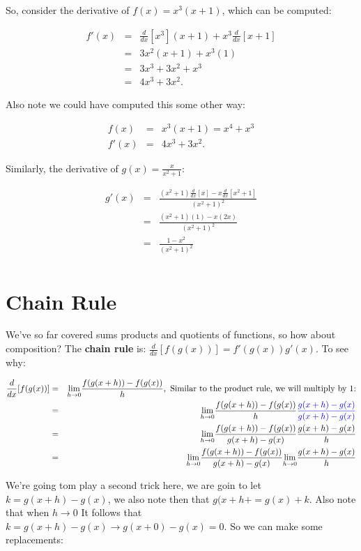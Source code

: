 So, consider the derivative of $f(x)=x^3(x+1)$, which can be computed:

\begin{eqnarray*}
f'(x)&=&\frac{d}{dx}[x^3](x+1)+x^3\frac{d}{dx}[x+1]\\
&=&3x^2(x+1)+x^3(1)\\
&=&3x^3+3x^2+x^3\\
&=&4x^3+3x^2.
\end{eqnarray*}

Also note we could have computed this some other way:

\begin{eqnarray*}
f(x)&=&x^3(x+1)=x^4+x^3\\
f'(x)&=&4x^3+3x^2.
\end{eqnarray*}

Similarly, the derivative of $g(x)=\frac{x}{x^2+1}$:

\begin{eqnarray*}
g'(x)&=&\frac{(x^2+1)\frac{d}{dx}[x]-x\frac{d}{dx}[x^2+1]}{(x^2+1)^2}\\
&=&\frac{(x^2+1)(1)-x(2x)}{(x^2+1)^2}\\
&=&\frac{1-x^2}{(x^2+1)^2}\\
\end{eqnarray*}


\section{Chain Rule}\label{Section:ChainRule}

We've so far covered sums products and quotients of functions, so how about composition?   The \textbf{ chain rule} is: $\frac{d}{dx}[f(g(x))]=f'(g(x))g'(x)$.  To see why:

\begin{eqnarray*}
\frac{d}{dx}[f(g(x))]&=&\limit{h}{0}\frac{f(g(x+h))-f(g(x))}{h},\ \text{Similar to the product rule, we will multiply by 1:}\\
&=&\limit{h}{0}\frac{f(g(x+h))-f(g(x))}{h}\textcolor{blue}{\frac{g(x+h)-g(x)}{g(x+h)-g(x)}}\\
&=&\limit{h}{0}\frac{f(g(x+h))-f(g(x))}{g(x+h)-g(x)}\frac{g(x+h)-g(x)}{h}\\
&=&\limit{h}{0}\frac{f(g(x+h))-f(g(x))}{g(x+h)-g(x)}\limit{h}{0}\frac{g(x+h)-g(x)}{h}\\
\end{eqnarray*}

We're going tom play a second trick here, we are goin to let $k=g(x+h)-g(x)$, we also note then that $g(x+h+=g(x)+k$.  Also note that when $h\to 0$  It follows that $k=g(x+h)-g(x)\to g(x+0)-g(x)=0$.  So we can make some replacements:

